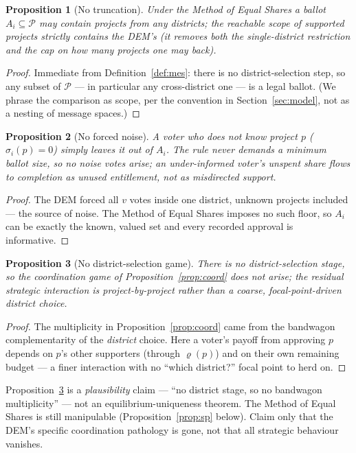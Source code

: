 \documentclass[11pt,letterpaper]{article}
\theoremstyle{definition}
\theoremstyle{plain}
\newtheorem{proposition}{Proposition}[section]
\theoremstyle{remark}
\newcommand{\Pset}{\mathcal{P}}
\newcommand{\votes}{v}
\newcommand{\mesrho}{\varrho}      %
\begin{document}
\begin{proposition}[No truncation]
\label{prop:mes-trunc}
Under the Method of Equal Shares a ballot $A_i\subseteq\Pset$ may contain projects from any
districts; the reachable \emph{scope} of supported projects strictly contains the DEM's (it removes
both the single-district restriction and the cap on how many projects one may back).
\end{proposition}
\begin{proof}
Immediate from Definition~\ref{def:mes}: there is no district-selection step, so any subset of
$\Pset$ --- in particular any cross-district one --- is a legal ballot. (We phrase the comparison as
scope, per the convention in Section~\ref{sec:model}, not as a nesting of message spaces.)
\end{proof}

\begin{proposition}[No forced noise]
\label{prop:mes-noise}
A voter who does not know project $p$ ($\sigma_i(p)=0$) simply leaves it out of $A_i$. The rule
never demands a minimum ballot size, so no noise votes arise; an under-informed voter's unspent
share flows to completion as unused entitlement, not as misdirected support.
\end{proposition}
\begin{proof}
The DEM forced all $\votes$ votes inside one district, unknown projects included --- the source of
noise. The Method of Equal Shares imposes no such floor, so $A_i$ can be exactly the known, valued
set and every recorded approval is informative.
\end{proof}

\begin{proposition}[No district-selection game]
\label{prop:mes-coord}
There is no district-selection stage, so the coordination game of Proposition~\ref{prop:coord} does
not arise; the residual strategic interaction is project-by-project rather than a coarse,
focal-point-driven district choice.
\end{proposition}
\begin{proof}
The multiplicity in Proposition~\ref{prop:coord} came from the bandwagon complementarity of the
\emph{district} choice. Here a voter's payoff from approving $p$ depends on $p$'s other supporters
(through $\mesrho(p)$) and on their own remaining budget --- a finer interaction with no ``which
district?'' focal point to herd on.
\end{proof}

\begin{watchout}
Proposition~\ref{prop:mes-coord} is a \emph{plausibility} claim --- ``no district stage, so no
bandwagon multiplicity'' --- not an equilibrium-uniqueness theorem. The Method of Equal Shares is
still manipulable (Proposition~\ref{prop:sp} below). Claim only that the DEM's specific coordination
pathology is gone, not that all strategic behaviour vanishes.
\end{watchout}
\end{document}
